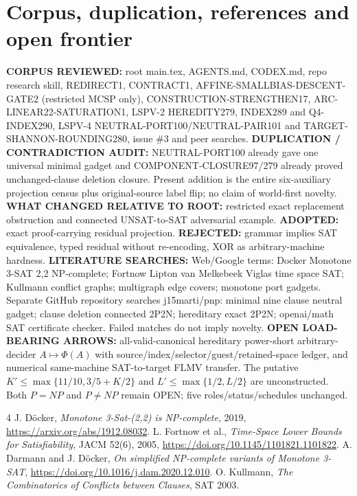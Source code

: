 \documentclass[11pt]{article}
\begin{document}
\section{Corpus, duplication, references and open frontier}
\noindent\textbf{CORPUS REVIEWED:} root main.tex, AGENTS.md, CODEX.md, repo research skill, REDIRECT1, CONTRACT1, AFFINE-SMALLBIAS-DESCENT-GATE2 (restricted MCSP only), CONSTRUCTION-STRENGTHEN17, ARC-LINEAR22-SATURATION1, LSPV-2 HEREDITY279, INDEX289 and Q4-INDEX290, LSPV-4 NEUTRAL-PORT100/NEUTRAL-PAIR101 and TARGET-SHANNON-ROUNDING280, issue \#3 and peer searches.
\noindent\textbf{DUPLICATION / CONTRADICTION AUDIT:} NEUTRAL-PORT100 already gave one universal minimal gadget and COMPONENT-CLOSURE97/279 already proved unchanged-clause deletion closure. Present addition is the entire six-auxiliary projection census plus original-source label flip; no claim of world-first novelty. \textbf{WHAT CHANGED RELATIVE TO ROOT:} restricted exact replacement obstruction and connected UNSAT-to-SAT adversarial example. \textbf{ADOPTED:} exact proof-carrying residual projection. \textbf{REJECTED:} grammar implies SAT equivalence, typed residual without re-encoding, XOR as arbitrary-machine hardness.
\noindent\textbf{LITERATURE SEARCHES:} Web/Google terms: Docker Monotone 3-SAT 2,2 NP-complete; Fortnow Lipton van Melkebeek Viglas time space SAT; Kullmann conflict graphs; multigraph edge covers; monotone port gadgets. Separate GitHub repository searches j15marti/pnp: minimal nine clause neutral gadget; clause deletion connected 2P2N; hereditary exact 2P2N; openai/math SAT certificate checker. Failed matches do not imply novelty.
\noindent\textbf{OPEN LOAD-BEARING ARROWS:} all-valid-canonical hereditary power-short arbitrary-decider $A\mapsto\Phi(A)$ with source/index/selector/guest/retained-space ledger, and numerical same-machine SAT-to-target FLMV transfer. The putative $K'\le\max\{11/10,3/5+K/2\}$ and $L'\le\max\{1/2,L/2\}$ are unconstructed. Both $P=NP$ and $P\ne NP$ remain OPEN; five roles/status/schedules unchanged.
\begin{thebibliography}{4}
 J. D\"ocker, \emph{Monotone 3-Sat-(2,2) is NP-complete}, 2019, \url{https://arxiv.org/abs/1912.08032}.
 L. Fortnow et al., \emph{Time-Space Lower Bounds for Satisfiability}, JACM 52(6), 2005, \url{https://doi.org/10.1145/1101821.1101822}.
 A. Darmann and J. D\"ocker, \emph{On simplified NP-complete variants of Monotone 3-SAT}, \url{https://doi.org/10.1016/j.dam.2020.12.010}.
 O. Kullmann, \emph{The Combinatorics of Conflicts between Clauses}, SAT 2003.
\end{thebibliography}
\end{document}
